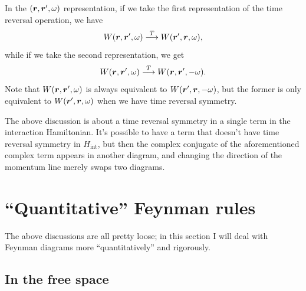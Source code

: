\documentclass[hyperref, a4paper, 12pt]{report}
\begin{document}
In the $(\vb*{r}, \vb*{r}', \omega)$ representation,
if we take the first representation of the time reversal operation,
we have 
\begin{equation}
    W(\vb*{r}, \vb*{r}', \omega) 
    \stackrel{T}{\longrightarrow} W(\vb*{r}', \vb*{r}, \omega),
\end{equation}
while if we take the second representation, we get 
\begin{equation}
    W(\vb*{r}, \vb*{r}', \omega) 
    \stackrel{T}{\longrightarrow} W(\vb*{r}, \vb*{r}', - \omega).
\end{equation}
Note that $W(\vb*{r}, \vb*{r}', \omega)$ is always equivalent to $W(\vb*{r}', \vb*{r}, -\omega)$,
but the former is only equivalent to $W(\vb*{r}', \vb*{r}, \omega)$
when we have time reversal symmetry.

The above discussion is about a time reversal symmetry in a single term 
in the interaction Hamiltonian.
It's possible to have a term that doesn't have time reversal symmetry in $H_{\text{int}}$,
but then the complex conjugate of the aforementioned complex term 
appears in another diagram,
and changing the direction of the momentum line 
merely swaps two diagrams.

\section{``Quantitative'' Feynman rules}\label{sec:quantitative-feynman}

The above discussions are all pretty loose; 
in this section I will deal with Feynman diagrams more ``quantitatively'' and rigorously.

\subsection{In the free space}\label{sec:free-space}
\end{document}
